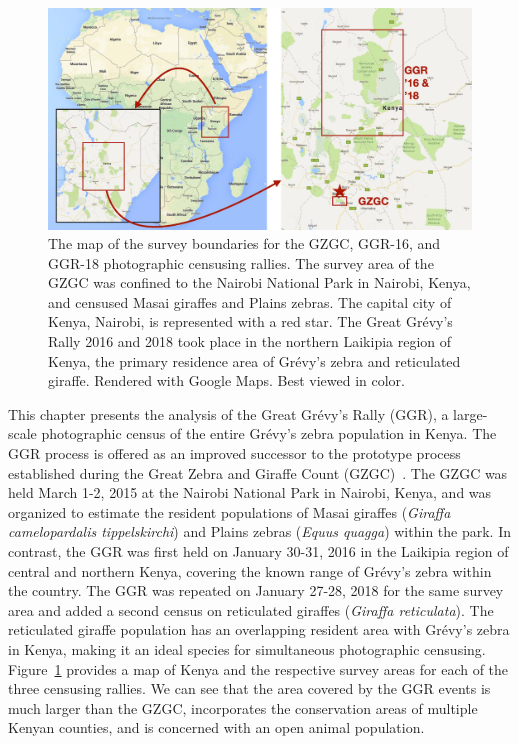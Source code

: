 \begin{figure}[!t]
    \begin{center}
        \includegraphics[width=1.0\linewidth]{resources/map-kenya.pdf}
    \end{center}
    \caption{The map of the survey boundaries for the GZGC, GGR-16, and GGR-18 photographic censusing rallies.  The survey area of the GZGC was confined to the Nairobi National Park in Nairobi, Kenya, and censused Masai giraffes and Plains zebras.  The capital city of Kenya, Nairobi, is represented with a red star.  The Great Gr\'evy's Rally 2016 and 2018 took place in the northern Laikipia region of Kenya, the primary residence area of Gr\'evy's zebra and reticulated giraffe.  Rendered with Google Maps. Best viewed in color.}
    \label{fig:maps-kenya}
\end{figure}

This chapter presents the analysis of the Great Gr\'evy's Rally (GGR), a large-scale photographic census of the entire Gr\'evy's zebra population in Kenya.  The GGR process is offered as an improved successor to the prototype process established during the Great Zebra and Giraffe Count (GZGC)~\cite{parham_photographic_2015}.  The GZGC was held March 1-2, 2015 at the Nairobi National Park in Nairobi, Kenya, and was organized to estimate the resident populations of Masai giraffes ({\em Giraffa camelopardalis tippelskirchi}) and Plains zebras ({\em Equus quagga}) within the park.  In contrast, the GGR was first held on January 30-31, 2016 in the Laikipia region of central and northern Kenya, covering the known range of Gr\'evy's zebra within the country.  The GGR was repeated on January 27-28, 2018 for the same survey area and added a second census on reticulated giraffes ({\em Giraffa reticulata}).  The reticulated giraffe population has an overlapping resident area with Gr\'evy's zebra in Kenya, making it an ideal species for simultaneous photographic censusing.  Figure~\ref{fig:maps-kenya} provides a map of Kenya and the respective survey areas for each of the three censusing rallies.  We can see that the area covered by the GGR events is much larger than the GZGC, incorporates the conservation areas of multiple Kenyan counties, and is concerned with an open animal population.

